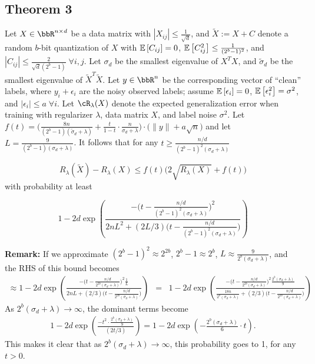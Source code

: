 \documentclass[12pt]{article}
\newcommand{\tsigma}{\tilde{\sigma}}
\newcommand{\eps}{\epsilon}
\newcommand{\tX}{\tilde{X}}
\newcommand{\defeq}{:=}
\begin{document}
\subsection{Theorem 3}
\begin{theorem}
Let $X\in \RR^{n\times d}$ be a data matrix with $|X_{ij}| \leq \frac{1}{\sqrt{d}}$, and $\tX\defeq X+C$ denote a random $b$-bit quantization of $X$ with $\expect{}{C_{ij}}=0$, $\expect{}{C_{ij}^2} \leq \frac{1}{(2^b-1)^2}$, and $|C_{ij}| \leq \frac{2}{\sqrt{d}(2^b-1)} \; \forall i,j$.  
Let $\sigma_d$ be the smallest eigenvalue of $X^T X$, and $\tsigma_d$ be the smallest eigenvalue of $\tX^T \tX$.
Let $y \in \RR^n$ be the corresponding vector of ``clean'' labels, where $y_i + \eps_i$ are the noisy observed labels; assume $\expect{}{\eps_i} = 0$, $\expect{}{\eps_i^2} = \sigma^2$, and $|\eps_i| \leq a \; \forall i$.  Let $\cR_{\lambda}(X)$ denote the expected generalization error when training with regularizer $\lambda$, data matrix $X$, and label noise $\sigma^2$.  Let $f(t) = \bigg(\frac{8n}{(2^b-1)(\tsigma_d + \lambda)} +\frac{t}{1-t}\cdot \frac{n}{\sigma_d+\lambda}\bigg)\cdot \big(\|y\| + a\sqrt{n}\big)$ and let $L = \frac{9}{(2^b-1)(\sigma_d + \lambda)}$.  It follows that for any $t\geq \frac{n/d}{(2^b-1)^2(\sigma_d + \lambda)}$

$$R_{\lambda}(\tX) - R_{\lambda}(X) \leq f(t)\Big(2\sqrt{R_{\lambda}(X)}+f(t)\Big)$$
with probability at least 

$$1 - 2d \exp \left(\frac{-\Big(t-\frac{n/d}{(2^b-1)^2(\sigma_d + \lambda)}\Big)^2}{2nL^2 + (2L/3)\Big(t-\frac{n/d}{(2^b-1)^2(\sigma_d + \lambda)}\Big)} \right)$$
\end{theorem}
\noindent\textbf{Remark:} If we approximate $(2^b-1)^2 \approx 2^{2b}$, $2^b-1\approx 2^b$, $L \approx \frac{9}{2^b(\sigma_d + \lambda)}$, and the RHS of this bound becomes
\begin{eqnarray*}
	\approx 1 - 2d \exp \left(\frac{-\Big(t-\frac{n/d}{2^{2b}(\sigma_d + \lambda)}\Big)^2\frac{1}{L}}{2nL + (2/3)\Big(t-\frac{n/d}{2^{2b}(\sigma_d + \lambda)}\Big)} \right) &=& 1 - 2d \exp \left(\frac{-\Big(t-\frac{n/d}{2^{2b}(\sigma_d + \lambda)}\Big)^2\frac{2^b(\sigma_d + \lambda)}{9}}{\frac{18n}{2^b(\sigma_d + \lambda)} + (2/3)\Big(t-\frac{n/d}{2^{2b}(\sigma_d + \lambda)}\Big)} \right)
\end{eqnarray*}
As $2^b (\sigma_d +\lambda) \rightarrow \infty$, the dominant terms become
\begin{eqnarray*}
1 - 2d \exp \left(\frac{-t^2 \cdot \frac{2^b(\sigma_d + \lambda)}{9}}{(2t/3)} \right) = 1 - 2d \exp \left(-  \frac{2^b(\sigma_d + \lambda)}{6}\cdot t \right).
\end{eqnarray*}
This makes it clear that as $2^b (\sigma_d + \lambda) \rightarrow \infty$, this probability goes to 1, for any $t > 0$.
\end{document}
